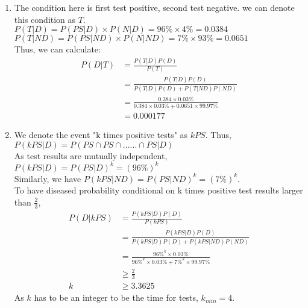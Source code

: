 \documentclass[12pt,letterpaper, onecolumn]{exam}
\begin{document}
\begin{questions}
\begin{solution}
\begin{enumerate}
            \item The condition here is first test positive, second test negative. we can denote this condition as $T$. \\
            $P(T|D) = P (PS|D) \times P(N|D) = 96\% \times 4\% =  0.0384$  \\
            $P(T|ND) = P (PS|ND) \times P(N|ND) = 7\% \times 93\% =  0.0651$ \\
            Thus, we can calculate: \\
            \begin{align*}
                P(D | T) & =  \frac{P(T|D)P(D)}{P(T)} \\
                & = \frac{P(T|D)P(D)}{P(T|D)P(D) + P(T|ND)P(ND)} \\
                & = \frac{0.384 \times 0.03\%}{0.384 \times 0.03\% + 0.0651 \times 99.97\%} \\
                & = 0.000177
            \end{align*}

            \item We denote the event "k times positive tests" as $kPS$. Thus,\\
            $P(kPS | D) = P(PS \cap PS \cap ...... \cap PS | D)$ \\
            As test results are mutually independent, \\
            $P(kPS | D) = P(PS | D)^k = (96\%)^k$ \\
            Similarly, we have $P(kPS | ND) = P(PS | ND)^k = (7\%)^k$. \\
            To have diseased probability conditional on k times positive test results larger than $\frac{2}{3}$,
            \begin{align*}
                P(D | kPS) & = \frac{P(kPS|D)P(D)}{P(kPS)} \\
                & = \frac{P(kPS|D)P(D)}{P(kPS|D)P(D) + P(kPS|ND)P(ND)} \\
                & = \frac{96\%^k \times 0.03\%}{96\%^k \times 0.03\% + 7\%^k \times 99.97\%} \\
                & \geq \frac{2}{3} \\
                k & \geq 3.3625
            \end{align*}
            As $k$ has to be an integer to be the time for tests, $k_{min} = 4$.


\end{enumerate}
\end{solution}
\end{questions}
\end{document}
